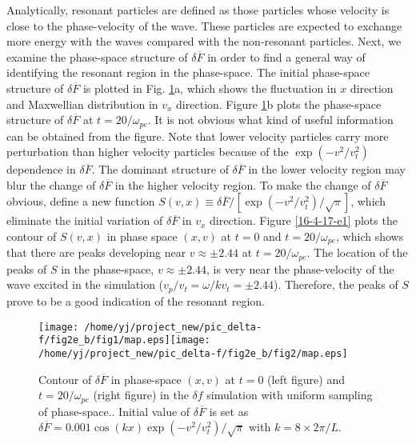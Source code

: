 \documentclass{article}
\begin{document}
Analytically, resonant particles are defined as those particles whose velocity
is close to the phase-velocity of the wave. These particles are expected to
exchange more energy with the waves compared with the non-resonant particles.
Next, we examine the phase-space structure of $\delta \overline{F}$ in order
to find a general way of identifying the resonant region in the phase-space.
The initial phase-space structure of $\delta \overline{F}$ is plotted in Fig.
\ref{16-4-18-p2}a, which shows the fluctuation in $x$ direction and Maxwellian
distribution in $v_x$ direction. Figure \ref{16-4-18-p2}b plots the
phase-space structure of $\delta \overline{F}$ at $t = 20 / \omega_{p e}$. It
is not obvious what kind of useful information can be obtained from the
figure. Note that lower velocity particles carry more perturbation than higher
velocity particles because of the $\exp (- v^2 / v_t^2)$ dependence in $\delta
\overline{F}$. The dominant structure of $\delta \overline{F}$ in the lower
velocity region may blur the change of $\delta \overline{F}$ in the higher
velocity region. To make the change of $\delta \overline{F}$ obvious, define a
new function $S (v, x) \equiv \delta \overline{F} / \left[ \exp (- v^2 /
v_t^2) / \sqrt{\pi} \right]$, which eliminate the initial variation of $\delta
\overline{F}$ in $v_x$ direction. Figure \ref{16-4-17-e1} plots the contour of
$S (v, x)$ in phase space $(x, v)$ at $t = 0$ and $t = 20 / \omega_{p e}$,
which shows that there are peaks developing near $v \approx \pm 2.44$ at $t =
20 / \omega_{p e}$. The location of the peaks of $S$ in the phase-space, $v
\approx \pm 2.44$, is very near the phase-velocity of the wave excited in the
simulation ($v_p / v_t = \omega / k v_t = \pm 2.44$). Therefore, the peaks of
$S$ prove to be a good indication of the resonant region.

\begin{figure}[h]
  \texttt{[image: /home/yj/project\_new/pic\_delta-f/fig2e\_b/fig1/map.eps]}\texttt{[image: /home/yj/project\_new/pic\_delta-f/fig2e\_b/fig2/map.eps]}
  \caption{\label{16-4-18-p2}Contour of $\delta \overline{F}$ in phase-space
  $(x, v)$ at $t = 0$ (left figure) and $t = 20 / \omega_{p e}$ (right figure)
  in the $\delta f$ simulation with uniform sampling of phase-space.. Initial
  value of $\delta \overline{F}$ is set as $\delta \overline{F} = 0.001 \cos
  (k x) \exp (- v^2 / v_t^2) / \sqrt{\pi}$ with $k = 8 \times 2 \pi / L$.}
\end{figure}
\end{document}
